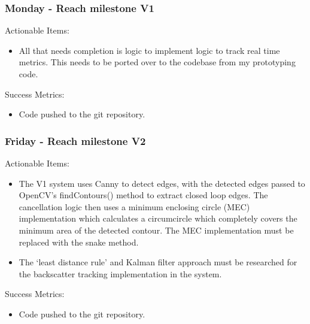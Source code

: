 \subsubsection{Monday - Reach milestone V1}

Actionable Items:

\begin{itemize}
    \item All that needs completion is logic to implement logic to track real time metrics. This needs to be ported over to the codebase from my prototyping code.
\end{itemize}

Success Metrics:

\begin{itemize}
    \item Code pushed to the git repository.
\end{itemize}








\subsubsection{Friday - Reach milestone V2}

Actionable Items:

\begin{itemize}
    \item The V1 system uses Canny to detect edges, with the detected edges passed to OpenCV's findContours() method to extract closed loop edges. The cancellation logic then uses a minimum enclosing circle (MEC) implementation which calculates a circumcircle which completely covers the minimum area of the detected contour. The MEC implementation must be replaced with the snake method.
    \item The `least distance rule' and Kalman filter approach must be researched for the backscatter tracking implementation in the system.
\end{itemize}

Success Metrics:

\begin{itemize}
    \item Code pushed to the git repository.
\end{itemize}
